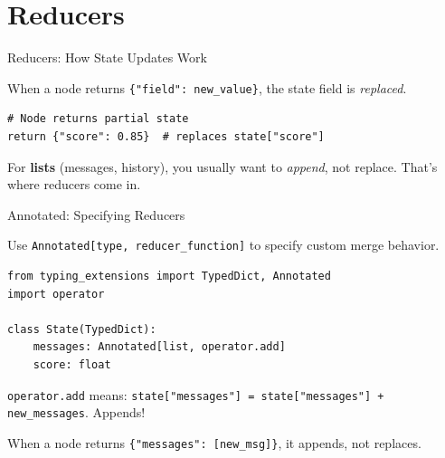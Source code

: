 \documentclass[aspectratio=169,11pt]{beamer}
\begin{document}
\section{Reducers}
\begin{frame}[fragile,t]{Reducers: How State Updates Work}
\setlength{\itemsep}{1pt}
\vspace{0.1cm}

\begin{conceptbox}
When a node returns \texttt{\{"field": new\_value\}}, the state field is \textit{replaced}.
\end{conceptbox}

\vspace{0.15cm}

\begin{codebox}
\begin{lstlisting}
# Node returns partial state
return {"score": 0.85}  # replaces state["score"]
\end{lstlisting}
\end{codebox}

\vspace{0.15cm}

\begin{tipbox}
For \textbf{lists} (messages, history), you usually want to \textit{append}, not replace. That's where reducers come in.
\end{tipbox}
\end{frame}

\begin{frame}[fragile,t,shrink=5]{Annotated: Specifying Reducers}
\vspace{0.1cm}

\begin{conceptbox}
Use \texttt{Annotated[type, reducer\_function]} to specify custom merge behavior.
\end{conceptbox}

\vspace{0.1cm}

\begin{codebox}
\begin{lstlisting}
from typing_extensions import TypedDict, Annotated
import operator

class State(TypedDict):
    messages: Annotated[list, operator.add]
    score: float
\end{lstlisting}
\end{codebox}

\vspace{0.1cm}

\begin{tipbox}
\texttt{operator.add} means: \texttt{state["messages"] = state["messages"] + new\_messages}. Appends!
\end{tipbox}

\vspace{0.1cm}

{\footnotesize When a node returns \texttt{\{"messages": [new\_msg]\}}, it appends, not replaces.}
\end{frame}
\end{document}
